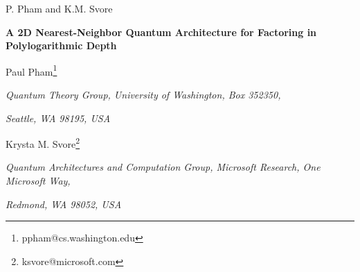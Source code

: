 \documentclass[twoside]{article}
\begin{document}
\setlength{\textheight}{8.0truein}    %

            {P. Pham and K.M. Svore}

\normalsize\textlineskip
\thispagestyle{empty}
\setcounter{page}{1}


\vspace*{0.88truein}

\alphfootnote


\centerline{\bf
A 2D Nearest-Neighbor Quantum Architecture for Factoring in Polylogarithmic Depth}
\vspace*{0.37truein}
\centerline{\footnotesize
Paul Pham\footnote{ppham@cs.washington.edu}}
\vspace*{0.015truein}
\centerline{\footnotesize\it Quantum Theory Group, University of Washington, Box 352350,}
\baselineskip=10pt
\centerline{\footnotesize\it Seattle, WA 98195, USA}
\vspace*{10pt}
\centerline{\footnotesize
Krysta M. Svore\footnote{ksvore@microsoft.com}}
\vspace*{0.015truein}
\centerline{\footnotesize\it Quantum Architectures and Computation Group, Microsoft Research, One Microsoft Way,}
\baselineskip=10pt
\centerline{\footnotesize\it Redmond, WA 98052, USA}
\vspace*{0.225truein}

\vspace*{0.21truein}
\end{document}
